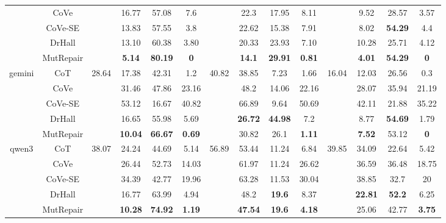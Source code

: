 \documentclass[acmsmall,screen,review,anonymous]{acmart}
\begin{document}
\begin{table}[t]
{\begin{tabular}{c|c|cccc|cccc|cccc}
          & CoVe  &       & 16.77 & 57.08 & 7.6   &       & 22.3  & 17.95 & 8.11  &       & 9.52  & 28.57 & 3.57 \\
          & CoVe-SE &       & 13.83 & 57.55 & 3.8   &       & 22.62 & 15.38 & 7.91  &       & 8.02  & \textbf{54.29} & 4.4 \\
          & DrHall &       & 13.10 & 60.38 & 3.80 &       & 20.33 & 23.93 & 7.10 &       & 10.28 & 25.71 & 4.12 \\
          & MutRepair  &       & \textbf{5.14} & \textbf{80.19} & \textbf{0} &       & \textbf{14.1} & \textbf{29.91} & \textbf{0.81} &       & \textbf{4.01} & \textbf{54.29} & \textbf{0} \\
    \midrule
    \multirow{5}[2]{*}{gemini} & CoT   & \multirow{5}[2]{*}{28.64} & 17.38 & 42.31 & 1.2   & \multirow{5}[2]{*}{40.82} & 38.85 & 7.23  & 1.66  & \multirow{5}[2]{*}{16.04} & 12.03 & 26.56 & 0.3 \\
          & CoVe  &       & 31.46 & 47.86 & 23.16 &       & 48.2  & 14.06 & 22.16 &       & 28.07 & 35.94 & 21.19 \\
          & CoVe-SE &       & 53.12 & 16.67 & 40.82 &       & 66.89 & 9.64  & 50.69 &       & 42.11 & 21.88 & 35.22 \\
          & DrHall &       & 16.65 & 55.98 & 5.69 &       & \textbf{26.72} & \textbf{44.98} & 7.2 &       & 8.77  & \textbf{54.69} & 1.79 \\
          & MutRepair  &       & \textbf{10.04} & \textbf{66.67} & \textbf{0.69} &       & 30.82 & 26.1  & \textbf{1.11}  &       & \textbf{7.52} & 53.12 & \textbf{0} \\
    \midrule
    \multirow{5}[2]{*}{qwen3} & CoT   & \multirow{5}[2]{*}{38.07} & 24.24 & 44.69 & 5.14  & \multirow{5}[2]{*}{56.89} & 53.44 & 11.24 & 6.84  & \multirow{5}[2]{*}{39.85} & 34.09 & 22.64 & 5.42 \\
          & CoVe  &       & 26.44 & 52.73 & 14.03 &       & 61.97 & 11.24 & 26.62 &       & 36.59 & 36.48 & 18.75 \\
          & CoVe-SE &       & 34.39 & 42.77 & 19.96 &       & 63.28 & 11.53 & 30.04 &       & 38.85 & 32.7  & 20 \\
          & DrHall &       & 16.77 & 63.99 & 4.94 &       & 48.2  & \textbf{19.6} & 8.37 &       & \textbf{22.81} & \textbf{52.2} & 6.25 \\
          & MutRepair  &       & \textbf{10.28} & \textbf{74.92} & \textbf{1.19} &       & \textbf{47.54} & \textbf{19.6} & \textbf{4.18} &       & 25.06 & 42.77 & \textbf{3.75} \\
    \bottomrule
    \end{tabular}
  }
  \label{tab:rq1.1}
\end{table}
\end{document}
